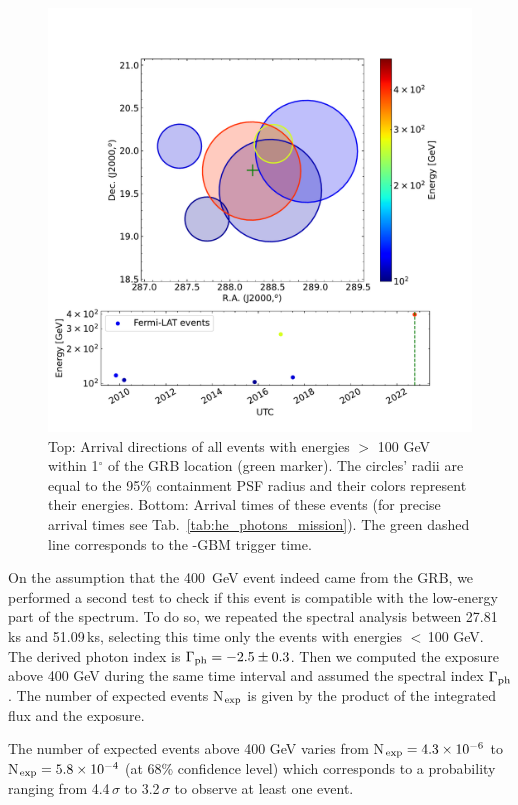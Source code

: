 \documentclass[preprint]{aastex631}
\begin{document}
\begin{figure}[t]
    \centering    
    \includegraphics[width=0.8\linewidth]{HEevents.pdf}    
    \caption{Top: Arrival directions of all events with energies $>$ 100 GeV within 1$^\circ$ of the GRB location (green marker). The circles' radii are equal to the 95\% containment PSF radius and their colors represent their energies. Bottom: Arrival times of these events (for precise arrival times see Tab.~\ref{tab:he_photons_mission}). The green dashed line corresponds to the \Fermi-GBM trigger time.}
    \label{fig:he_photons_mission}
\end{figure}

On the assumption that the 400~GeV event indeed came from the GRB, we performed a second test to check if this event is compatible with the low-energy part of the spectrum. To do so, we repeated the spectral analysis between 27.81\,ks and 51.09\,ks, selecting this time only the events with energies $<$\,100 GeV. 
The derived photon index is $\Gamma_{\rm ph}=-2.5\pm0.3$. 
Then we computed the exposure above 400 GeV during the same time interval and assumed the spectral index $\Gamma_{\rm ph}$. The number of expected events N$_{\rm exp}$ is given by the product of the integrated flux and the exposure. 

The number of expected events above 400 GeV varies from N$_{\rm exp}=4.3\times10^{-6}$ to N$_{\rm exp}=5.8\times10^{-4}$ (at 68\% confidence level) which corresponds to a probability ranging from 4.4\,$\sigma$ to 3.2\,$\sigma$ to observe at least one event.
\end{document}
